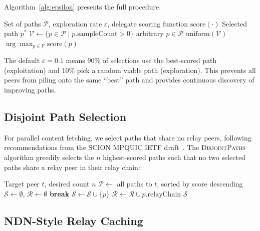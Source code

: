 \documentclass[sigconf,nonacm]{acmart}
\begin{document}
Algorithm~\ref{alg:epsilon} presents the full procedure.

\begin{algorithm}[t]
\caption{Epsilon-Greedy Path Selection}
\label{alg:epsilon}
\begin{algorithmic}[1]
\Require Set of paths $\mathcal{P}$, exploration rate $\varepsilon$, delegate scoring function $\text{score}(\cdot)$
\Ensure Selected path $p^*$
\State $\mathcal{V} \gets \{p \in \mathcal{P} \mid p.\text{sampleCount} > 0\}$ 
  \State \Return arbitrary $p \in \mathcal{P}$ 
\EndIf
{}
  \State \Return $\text{uniform}(\mathcal{V})$ 
\EndIf
\State \Return $\arg\max_{p \in \mathcal{V}} \text{score}(p)$ 
\end{algorithmic}
\end{algorithm}

The default $\varepsilon = 0.1$ means 90\% of selections use the best-scored path (exploitation) and 10\% pick a random viable path (exploration). This prevents all peers from piling onto the same ``best'' path and provides continuous discovery of improving paths.

\subsection{Disjoint Path Selection}

For parallel content fetching, we select paths that share no relay peers, following recommendations from the SCION MPQUIC IETF draft~\cite{scionmpquic}. The \textsc{DisjointPaths} algorithm greedily selects the $n$ highest-scored paths such that no two selected paths share a relay peer in their relay chain:

\begin{algorithmic}[1]
\Require Target peer $t$, desired count $n$
\State $\mathcal{P} \gets$ all paths to $t$, sorted by score descending
\State $\mathcal{S} \gets \emptyset$, $\mathcal{R} \gets \emptyset$ 
   \textbf{break} \EndIf
    \State $\mathcal{S} \gets \mathcal{S} \cup \{p\}$
    \State $\mathcal{R} \gets \mathcal{R} \cup p.\text{relayChain}$
  \EndIf
\EndFor
\State \Return $\mathcal{S}$
\end{algorithmic}

\subsection{NDN-Style Relay Caching}
\end{document}
